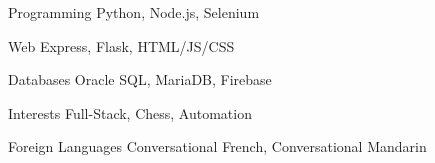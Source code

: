 

\begin{cvskills}

  \cvskill
  {Programming} %
  {Python, Node.js, Selenium} %

  \cvskill
  {Web} %
  {Express, Flask, HTML/JS/CSS} %

  \cvskill
  {Databases} %
  {Oracle SQL, MariaDB, Firebase} %


  \cvskill
  {Interests} %
  {Full-Stack, Chess, Automation} %

  \cvskill
  {Foreign Languages} %
  {Conversational French, Conversational Mandarin} %

\end{cvskills}
